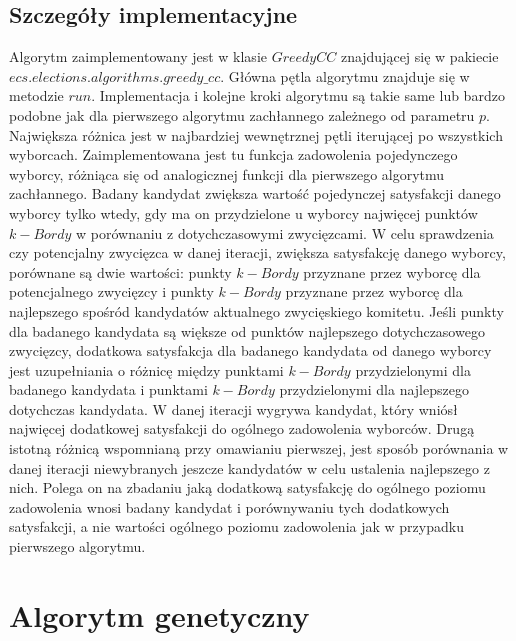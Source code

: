 \documentclass[pdflatex,11pt]{../aghdoc_version2}
\begin{document}
\subsection{Szczegóły implementacyjne}
Algorytm zaimplementowany jest w klasie $GreedyCC$ znajdującej się w pakiecie
$ecs.elections.algorithms.greedy\_cc$. Główna pętla algorytmu znajduje się w metodzie $run$.
Implementacja i kolejne kroki algorytmu są takie same lub bardzo podobne jak dla
pierwszego algorytmu zachłannego zależnego od parametru $p$. Największa różnica jest w najbardziej wewnętrznej pętli
iterującej po wszystkich wyborcach. Zaimplementowana jest tu funkcja zadowolenia
pojedynczego wyborcy, różniąca się od analogicznej funkcji dla pierwszego algorytmu
zachłannego. Badany kandydat zwiększa wartość pojedynczej satysfakcji danego wyborcy
tylko wtedy, gdy ma on przydzielone u wyborcy najwięcej punktów $k-Bordy$ w porównaniu z
dotychczasowymi zwycięzcami. W celu sprawdzenia czy potencjalny zwycięzca w danej
iteracji, zwiększa satysfakcję danego wyborcy, porównane są dwie wartości: punkty $k-Bordy$
przyznane przez wyborcę dla potencjalnego zwycięzcy i punkty $k-Bordy$ przyznane przez
wyborcę dla najlepszego spośród kandydatów aktualnego zwycięskiego komitetu. Jeśli
punkty dla badanego kandydata są większe od punktów najlepszego dotychczasowego
zwycięzcy, dodatkowa satysfakcja dla badanego kandydata od danego wyborcy jest
uzupełniania o różnicę między punktami $k-Bordy$ przydzielonymi dla badanego kandydata i
punktami $k-Bordy$ przydzielonymi dla najlepszego dotychczas kandydata. W danej iteracji
wygrywa kandydat, który wniósł najwięcej dodatkowej satysfakcji do ogólnego zadowolenia
wyborców. Drugą istotną różnicą wspomnianą przy omawianiu pierwszej, jest sposób
porównania w danej iteracji niewybranych jeszcze kandydatów w celu ustalenia najlepszego
z nich. Polega on na zbadaniu jaką dodatkową satysfakcję do ogólnego poziomu
zadowolenia wnosi badany kandydat i porównywaniu tych dodatkowych satysfakcji, a nie
wartości ogólnego poziomu zadowolenia jak w przypadku pierwszego algorytmu.

\section{Algorytm genetyczny}



\end{document}
